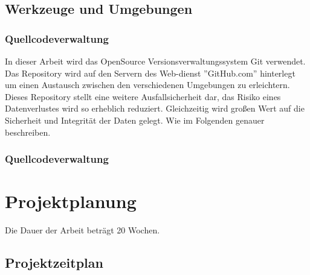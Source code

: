 \documentclass[a4paper,16pt,fleqn,titlepage]{article}
\begin{document}
\subsection{Werkzeuge und Umgebungen}
\subsubsection{Quellcodeverwaltung}
In dieser Arbeit wird das OpenSource Versionsverwaltungssystem Git verwendet.
Das Repository wird auf den Servern des Web-dienst ''GitHub.com'' hinterlegt um
einen Austausch zwischen den verschiedenen Umgebungen zu erleichtern. Dieses
Repository stellt eine weitere Ausfallsicherheit dar, das Risiko eines
Datenverlustes wird so erheblich reduziert. Gleichzeitig wird großen Wert auf
die Sicherheit und Integrität der Daten gelegt. Wie im Folgenden
genauer beschreiben.

\subsubsection{Quellcodeverwaltung}
\section{Projektplanung}
Die Dauer der Arbeit beträgt 20 Wochen.
\subsection{Projektzeitplan}


\end{document}
